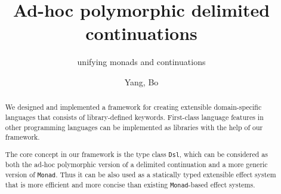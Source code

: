 \documentclass[acmsmall,10pt,review,screen,anonymous]{acmart}
\begin{document}
\title{Ad-hoc polymorphic delimited continuations}
\subtitle{unifying monads and continuations}

\author{Yang, Bo}


\begin{abstract}
We designed and implemented a framework for creating extensible domain-specific languages that consists of library-defined keywords.
First-class language features in other programming languages can be implemented as libraries with the help of our framework.

The core concept in our framework is the type class \texttt{Dsl}, which can be considered as both the ad-hoc polymorphic version of a delimited continuation and a more generic version of \texttt{Monad}. Thus it can be also used as a statically typed extensible effect system that is more efficient and more concise than existing \texttt{Monad}-based effect systems.
\end{abstract}
\end{document}
